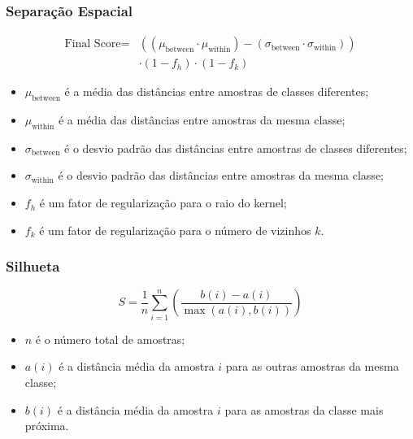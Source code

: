 \begin{frame}

    \frametitle{Separação Espacial}

    \begin{equation}
    \begin{split}
        \text{Final Score} ={}& ((\mu_{\text{between}} \cdot \mu_{\text{within}}) - (\sigma_{\text{between}} \cdot \sigma_{\text{within}})) \\
        & \cdot (1 - f_h) \cdot (1 - f_k)
    \end{split}
    \end{equation}

    \begin{itemize}
        \item $\mu_{\text{between}}$ é a média das distâncias entre amostras de classes diferentes;
        \item $\mu_{\text{within}}$ é a média das distâncias entre amostras da mesma classe;
        \item $\sigma_{\text{between}}$ é o desvio padrão das distâncias entre amostras de classes diferentes;
        \item $\sigma_{\text{within}}$ é o desvio padrão das distâncias entre amostras da mesma classe;
        \item $f_h$ é um fator de regularização para o raio do kernel;
        \item $f_k$ é um fator de regularização para o número de vizinhos $k$.
    \end{itemize}

\end{frame}

\begin{frame}

    \frametitle{Silhueta}

    \begin{equation}
        S = \frac{1}{n} \sum_{i=1}^{n} \left( \frac{b(i) - a(i)}{\max(a(i), b(i))} \right)
    \end{equation}

    \begin{itemize}
        \item $n$ é o número total de amostras;
        \item $a(i)$ é a distância média da amostra $i$ para as outras amostras da mesma classe;
        \item $b(i)$ é a distância média da amostra $i$ para as amostras da classe mais próxima.
    \end{itemize}

\end{frame}

